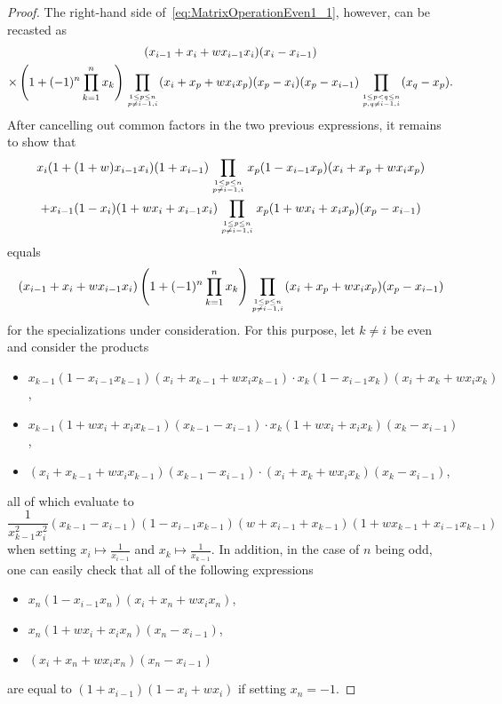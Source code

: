 \documentclass[10pt,a4paper]{article}
\theoremstyle{definition}
\newcommand\myatop[2]{\genfrac{}{}{0pt}{}{#1}{#2}}
\begin{document}
\begin{proof}
		The right-hand side of~\eqref{eq:MatrixOperationEven1_1}, however, can be recasted as
		\begin{multline*}
			(x_{i-1}+x_i+w x_{i-1} x_i) (x_i-x_{i-1})\\
			\times \left(1+ (-1)^n  \prod_{k=1}^{n} x_k \right)\prod\limits_{\myatop{1 \le p \le n}{p \neq i-1,i}} (x_i+ x_p +w  x_i x_p) (x_p-x_i) (x_p-x_{i-1}) \prod_{\myatop{1 \le p <q \le n}{p,q \neq i-1,i}} (x_q -x_p).
		\end{multline*}
		After cancelling out common factors in the two previous expressions, it remains to show that
		\begin{multline*}
			x_i (1+(1+w) x_{i-1} x_i) (1+x_{i-1}) \prod_{\myatop{1 \le p \le n}{p \neq i-1,i}} x_p (1-x_{i-1} x_p)  (x_i+x_p+w x_i x_p) \\
			+ x_{i-1} (1-x_i) (1+w x_i+x_{i-1} x_i) \prod\limits_{\myatop{1 \le p \le n}{p \neq i-1,i}} x_p (1+ w x_i + x_i x_p) (x_p-x_{i-1}) 
		\end{multline*}
		equals
		\begin{equation*}
			(x_{i-1}+x_i+w x_{i-1} x_i) \left(1+ (-1)^n \prod_{k=1}^{n} x_k \right)\prod\limits_{\myatop{1 \le p \le n}{p \neq i-1,i}} (x_i+ x_p +w  x_i x_p) (x_p-x_{i-1}) 
		\end{equation*}
		for the specializations under consideration. For this purpose, let $k \neq i$ be even and consider the products
		\begin{itemize}
			\item $x_{k-1} (1-x_{i-1} x_{k-1})  (x_i+x_{k-1}+w x_i x_{k-1}) \cdot x_{k} (1-x_{i-1} x_{k})  (x_i+x_{k}+w x_i x_{k})$,
			\item $x_{k-1} (1+ w x_i + x_i x_{k-1}) (x_{k-1}-x_{i-1}) \cdot x_{k} (1+ w x_i + x_i x_{k}) (x_{k}-x_{i-1})$,
			\item $(x_i+ x_{k-1} +w  x_i x_{k-1}) (x_{k-1}-x_{i-1}) \cdot (x_i+ x_{k} +w  x_i x_{k}) (x_{k}-x_{i-1})$,
		\end{itemize}
		all of which evaluate to
		\begin{equation*}
			\frac{1}{x_{k-1}^2 x_i^2} (x_{k-1}-x_{i-1})(1-x_{i-1} x_{k-1})(w+x_{i-1}+x_{k-1})(1+w x_{k-1}+x_{i-1} x_{k-1})
		\end{equation*}
		when setting $x_i \mapsto \frac{1}{x_{i-1}}$ and $x_k \mapsto \frac{1}{x_{k-1}}$. In addition, in the case of $n$ being odd, one can easily check that all of the following expressions
		\begin{itemize}
			\item $x_{n} (1-x_{i-1} x_{n})  (x_i+x_{n}+w x_i x_{n})$,
			\item $x_{n} (1+ w x_i + x_i x_{n}) (x_{n}-x_{i-1})$,
			\item $(x_i+ x_{n} +w  x_i x_{n}) (x_{n}-x_{i-1})$
		\end{itemize}
		are equal to $(1+x_{i-1})(1 - x_i + w x_i)$ if setting $x_n=-1$.
		

\end{proof}
\end{document}
